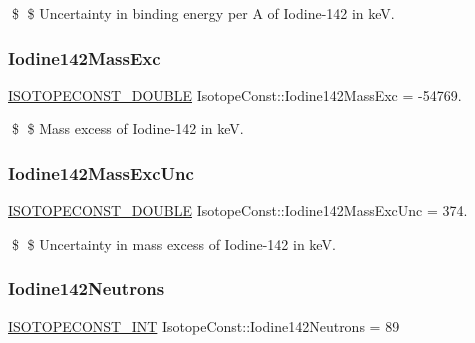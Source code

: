 \$ \$ Uncertainty in binding energy per A of Iodine-\/142 in keV. \mbox{\label{group___isotope_const-_iodine-_i142_ga75084cd78d1cc5f3f79f47965ca19dc7}} 
\subsubsection{\texorpdfstring{Iodine142\+Mass\+Exc}{Iodine142MassExc}}
{\footnotesize\ttfamily \mbox{\hyperlink{group___isotope_const-_macros_ga8f45a7272ce02c0b4c65c44636ed719a}{I\+S\+O\+T\+O\+P\+E\+C\+O\+N\+S\+T\+\_\+\+D\+O\+U\+B\+LE}} Isotope\+Const\+::\+Iodine142\+Mass\+Exc = -\/54769.}

\$ \$ Mass excess of Iodine-\/142 in keV. \mbox{\label{group___isotope_const-_iodine-_i142_gabeb203135f0eb843a6396d08518ad5ce}} 
\subsubsection{\texorpdfstring{Iodine142\+Mass\+Exc\+Unc}{Iodine142MassExcUnc}}
{\footnotesize\ttfamily \mbox{\hyperlink{group___isotope_const-_macros_ga8f45a7272ce02c0b4c65c44636ed719a}{I\+S\+O\+T\+O\+P\+E\+C\+O\+N\+S\+T\+\_\+\+D\+O\+U\+B\+LE}} Isotope\+Const\+::\+Iodine142\+Mass\+Exc\+Unc = 374.}

\$ \$ Uncertainty in mass excess of Iodine-\/142 in keV. \mbox{\label{group___isotope_const-_iodine-_i142_ga80fcb033e325bedc4f9d823df92c027b}} 
\subsubsection{\texorpdfstring{Iodine142\+Neutrons}{Iodine142Neutrons}}
{\footnotesize\ttfamily \mbox{\hyperlink{group___isotope_const-_macros_ga5f18360b3e99483a35c32d789e62621c}{I\+S\+O\+T\+O\+P\+E\+C\+O\+N\+S\+T\+\_\+\+I\+NT}} Isotope\+Const\+::\+Iodine142\+Neutrons = 89}

